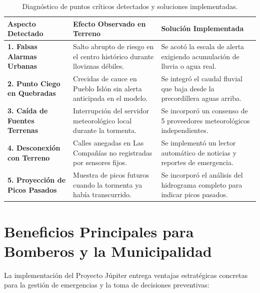 \documentclass[11pt,a4paper]{article}
\begin{document}
\begin{table}[htbp]
\centering
\small
\caption{Diagnóstico de puntos críticos detectados y soluciones implementadas.}
\label{tab:diagnostico}
\begin{tabularx}{\textwidth}{@{} X X X @{}}
\toprule
\textbf{Aspecto Detectado} & \textbf{Efecto Observado en Terreno} & \textbf{Solución Implementada} \\
\midrule
\textbf{1. Falsas Alarmas Urbanas} & Salto abrupto de riesgo en el centro histórico durante lloviznas débiles. & Se acotó la escala de alerta exigiendo acumulación de lluvia o agua real. \\
\addlinespace
\textbf{2. Punto Ciego en Quebradas} & Crecidas de cauce en Pueblo Islón sin alerta anticipada en el modelo. & Se integró el caudal fluvial que baja desde la precordillera aguas arriba. \\
\addlinespace
\textbf{3. Caída de Fuentes Terrenas} & Interrupción del servidor meteorológico local durante la tormenta. & Se incorporó un consenso de 5 proveedores meteorológicos independientes. \\
\addlinespace
\textbf{4. Desconexión con Terreno} & Calles anegadas en Las Compañías no registradas por sensores fijos. & Se implementó un lector automático de noticias y reportes de emergencia. \\
\addlinespace
\textbf{5. Proyección de Picos Pasados} & Muestra de picos futuros cuando la tormenta ya había transcurrido. & Se incorporó el análisis del hidrograma completo para indicar picos pasados. \\
\bottomrule
\end{tabularx}
\end{table}

\section{Beneficios Principales para Bomberos y la Municipalidad}

La implementación del Proyecto Júpiter entrega ventajas estratégicas concretas para la gestión de emergencias y la toma de decisiones preventivas:
\end{document}
